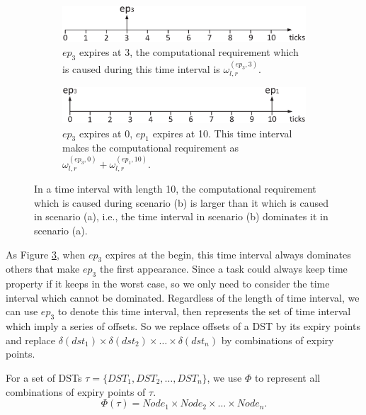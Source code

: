 \documentclass[sigconf]{acmart}
\begin{document}
\begin{figure}  
  \centering
  \begin{subfigure}[t]{3.33in}
    \centering
    \includegraphics[scale=.34]{graphics/figure_combina2.eps}
    \caption{$ep_3$ expires at 3, the computational requirement which is caused during this time interval is $\omega_{l,r}^{(ep_3,3)}.$}\label{figure_combination1}
  \end{subfigure}
  \quad
  \begin{subfigure}[t]{3.33in}
    \centering
    \includegraphics[scale=.34]{graphics/figure_combina1.eps}
    \caption{$ep_3$ expires at 0, $ep_1$ expires at 10. This time interval makes the computational requirement as $\omega_{l,r}^{(ep_3,0)}+\omega_{l,r}^{(ep_1,10)}$.}\label{figure_combination2}
  \end{subfigure}
  \caption{In a time interval with length 10, the computational requirement which is caused during scenario (b) is larger than it which is caused in scenario (a), i.e., the time interval in scenario (b) dominates it in scenario (a).}\label{figure_combination}
\end{figure}
As Figure \ref{figure_combination}, when $ep_3$ expires at the begin, this time interval always dominates others that make $ep_3$ the first appearance. Since a task could always keep time property if it keeps in the worst case, so we only need to consider the time interval which cannot be dominated. Regardless of the length of time interval, we can use $ep_3$ to denote this time interval, then represents the set of time interval which imply a series of offsets. So we replace offsets of a DST by its expiry points and replace $\delta(dst_1)\times\delta(dst_2)\times\dots\times\delta(dst_n)$ by combinations of expiry points.
\begin{definition}
For a set of DSTs $\tau=\{DST_1,DST_2,\dots,DST_n\}$, we use $\Phi$ to represent all combinations of expiry points of $\tau$.
\begin{equation}
  \Phi(\tau)=Node_1 \times Node_2\times\dots\times Node_n.
\end{equation}\label{equation_combination}
\end{definition}
\end{document}
